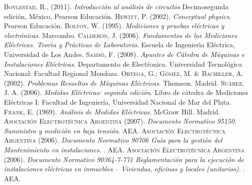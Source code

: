 \begin{thebibliography}{X}
	 \textsc{Boylestad, R.}, (2011). \textit{Introducción al análisis de circuitos} Decimosegunda edición, México, Pearson Educación.
	 \textsc{Hewitt, P.} (2002). \textit{Conceptual physics}. Pearson Educación.
	 \textsc{Bolton, W.} (1995). \textit{Mediciones y pruebas eléctricas y electrónicas}. Marcombo.
	 \textsc{Calderón, J.} (2006). \textit{Fundamentos de las Mediciones Eléctricas. Teorı́a y Prácticas de Laboratorio}. Escuela de Ingenierı́a Eléctrica, Universidad de Los Andes.
	 \textsc{Samsó, F.} (2008). \textit{Apuntes de Cátedra de Máquinas e Instalaciones Eléctricas}. Departamento de Electŕonica. Universidad Tecnológica Nacional: Facultad Regional Mendoza.
	 \textsc{Ortega, G.; Gómez, M. \& Bachiller, A.} (2002). \textit{Problemas Resueltos de Máquinas Eléctricas}. Thomson. Madrid.
	 \textsc{Suárez, J. A.} (2006). \textit{Medidas Eléctricas: segunda edición}. Libro de cátedra de Mediciones Eléctricas I: Facultad de Ingeniería, Universidad Nacional de Mar del Plata.
	 \textsc{Frank, E.} (1969). \textit{Análisis de Medidas Eléctricas}. McGraw Hill. Madrid.
	 \textsc{Asociación Electrotécnica Argentina} (2007). \textit{Documento Normativo 95150. Suministro y medición en baja tensión}. AEA.
	 \textsc{Asociación Electrotécnica Argentina} (2006). \textit{Documento Normativo 90706 Guía para la gestión del Mantenimiento en instalaciones. }. AEA.
	 \textsc{Asociación Electrotécnica Argentina} (2006). \textit{Documento Normativo 90364-7-771 Reglamentación para la ejecución de instalaciones eléctricas en inmuebles – Viviendas, oficinas y locales (unitarios). }. AEA.
	
\end{thebibliography}